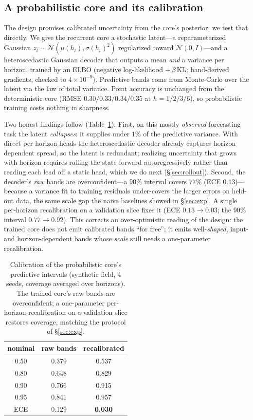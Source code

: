 \documentclass[10pt]{article}
\begin{document}
\subsection{A probabilistic core and its calibration}
\label{sec:calibcore}
The design promises calibrated uncertainty from the core's posterior; we test that
directly. We give the recurrent core a stochastic latent---a reparameterized
Gaussian $z_t\sim\mathcal{N}(\mu(h_t),\sigma(h_t)^2)$ regularized toward
$\mathcal{N}(0,I)$---and a heteroscedastic Gaussian decoder that outputs a mean
\emph{and} a variance per horizon, trained by an ELBO (negative log-likelihood
$+\,\beta\,$KL; hand-derived gradients, checked to $4\times10^{-9}$). Predictive
bands come from Monte-Carlo over the latent via the law of total variance. Point
accuracy is unchanged from the deterministic core (RMSE $0.30/0.33/0.34/0.35$ at
$h=1/2/3/6$), so probabilistic training costs nothing in sharpness.

Two honest findings follow (Table~\ref{tab:calibcore}). First, on this mostly
\emph{observed} forecasting task the latent \emph{collapses}: it supplies under
$1\%$ of the predictive variance. With direct per-horizon heads the heteroscedastic
decoder already captures horizon-dependent spread, so the latent is redundant;
realizing uncertainty that grows with horizon requires rolling the state forward
autoregressively rather than reading each lead off a static head, which we do next
(\S\ref{sec:rollout}). Second, the
decoder's \emph{raw} bands are overconfident---a $90\%$ interval covers $77\%$ (ECE
$0.13$)---because a variance fit to training residuals under-covers the larger
errors on held-out data, the same scale gap the naive baselines showed in
\S\ref{sec:exp}. A single per-horizon recalibration on a validation slice fixes it
(ECE $0.13\!\to\!0.03$; the $90\%$ interval $0.77\!\to\!0.92$). This corrects an
over-optimistic reading of the design: the trained core does not emit calibrated
bands ``for free''; it emits well-\emph{shaped}, input- and horizon-dependent bands
whose \emph{scale} still needs a one-parameter recalibration.

\begin{table}[t]
\centering
\small
\begin{tabular}{@{}ccc@{}}
\toprule
nominal & raw bands & recalibrated \\
\midrule
0.50 & 0.379 & 0.537 \\
0.80 & 0.648 & 0.829 \\
0.90 & 0.766 & 0.915 \\
0.95 & 0.841 & 0.957 \\
\midrule
ECE & 0.129 & \textbf{0.030} \\
\bottomrule
\end{tabular}
\caption{Calibration of the probabilistic core's predictive intervals (synthetic
field, 4 seeds, coverage averaged over horizons). The trained core's raw bands are
overconfident; a one-parameter per-horizon recalibration on a validation slice
restores coverage, matching the protocol of \S\ref{sec:exp}.}
\label{tab:calibcore}
\end{table}
\end{document}
